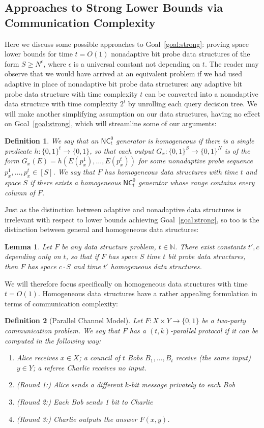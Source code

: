 \documentclass[11pt]{article}
\newtheorem{lemma}{Lemma}
\newtheorem{definition}{Definition}
\newcommand{\B}{\{0,1\}}
\begin{document}
\subsection{Approaches to Strong Lower Bounds via Communication Complexity}\label{subsec:communication}

Here we discuss some possible approaches to Goal~\ref{goal:strong}: proving space lower bounds for time $t=O(1)$ nonadaptive bit probe data structures of the form $S \geq N^\epsilon$, where $\epsilon$ is a universal constant not depending on $t$. The reader may observe that we would have arrived at an equivalent problem if we had used adaptive in place of nonadaptive bit probe data structures: any adaptive bit probe data structure with time complexity $t$ can be converted into a nonadaptive data structure with time complexity $2^t$ by unrolling each query decision tree. We will make another simplifying assumption on our data structures, having no effect on Goal~\ref{goal:strong}, which will streamline some of our arguments:
\begin{definition}
We say that an $\mathsf{NC}^0_t$ generator is homogeneous if there is a single predicate $h: \B^t \to \B$, so that each output $G_x: \B^S \to \B^N$ is of the form $G_x(E) = h(E(p_x^1),\ldots,E(p_x^t))$ for some nonadaptive probe sequence $p_x^1,\ldots,p_x^t \in [S]$. We say that $F$ has homogeneous data structures with time $t$ and space $S$ if there exists a homogeneous $\mathsf{NC}^0_t$ generator whose range contains every column of $F$.
\end{definition}
Just as the distinction between adaptive and nonadaptive data structures is irrelevant with respect to lower bounds achieving Goal~\ref{goal:strong}, so too is the distinction between general and homogeneous data structures:
\begin{lemma}
Let $F$ be any data structure problem, $t \in \mathbb{N}$. There exist constants $t',c$ depending only on $t$, so that if $F$ has space $S$ time $t$ bit probe data structures, then $F$ has space $c \cdot S$ and time $t'$ homogeneous data structures.
\end{lemma}

We will therefore focus specifically on homogeneous data structures with time $t = O(1)$.
Homogeneous data structures have a rather appealing formulation in terms of communication complexity:
\begin{definition}[Parallel Channel Model]
Let $F: X \times Y \to \{0,1\}$ be a two-party communication problem. We say that $F$ has a $(t,k)$-parallel protocol if it can be computed in the following way:
\begin{enumerate}
	\item Alice receives $x \in X$; a council of $t$ Bobs $B_1,\ldots, B_t$ receive (the same input) $y \in Y$; a referee Charlie receives no input.
	\item (Round 1:) Alice sends a different $k$-bit message privately to each Bob
	\item (Round 2:) Each Bob sends 1 bit to Charlie
	\item (Round 3:) Charlie outputs the answer $F(x,y)$.
\end{enumerate}
\end{definition}
\end{document}

